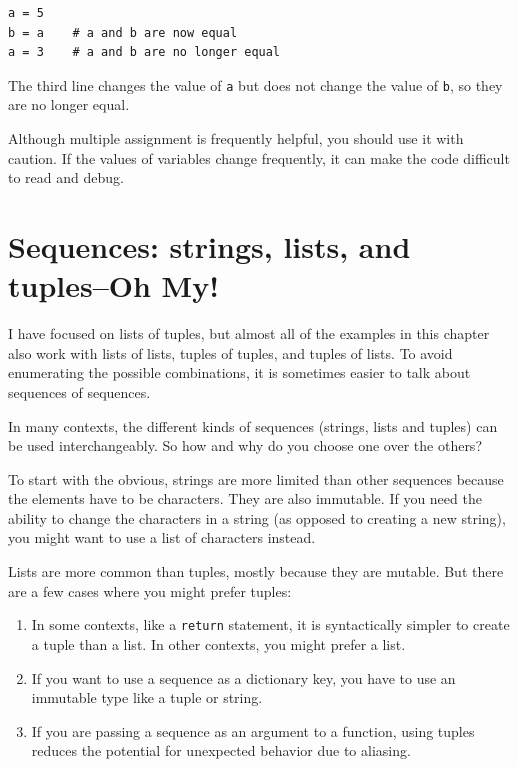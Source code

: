 \documentclass[10pt]{book}
\begin{document}
\beforeverb
\begin{verbatim}
a = 5
b = a    # a and b are now equal
a = 3    # a and b are no longer equal
\end{verbatim}
\afterverb
%
The third line changes the value of {\tt a} but does not change the
value of {\tt b}, so they are no longer equal. 

Although multiple assignment is frequently helpful, you should use it
with caution.  If the values of variables change frequently, it can
make the code difficult to read and debug.

\section{Sequences: strings, lists, and tuples--Oh My!}

I have focused on lists of tuples, but almost all of the examples in
this chapter also work with lists of lists, tuples of tuples, and
tuples of lists.  To avoid enumerating the possible combinations, it
is sometimes easier to talk about sequences of sequences.

In many contexts, the different kinds of sequences (strings, lists and
tuples) can be used interchangeably.  So how and why do you choose one
over the others?


To start with the obvious, strings are more limited than other
sequences because the elements have to be characters.  They are
also immutable.  If you need the ability to change the characters
in a string (as opposed to creating a new string), you might
want to use a list of characters instead.

Lists are more common than tuples, mostly because they are mutable.
But there are a few cases where you might prefer tuples:

\begin{enumerate}

\item In some contexts, like a {\tt return} statement, it is
syntactically simpler to create a tuple than a list.  In other
contexts, you might prefer a list.

\item If you want to use a sequence as a dictionary key, you
have to use an immutable type like a tuple or string.

\item If you are passing a sequence as an argument to a function,
using tuples reduces the potential for unexpected behavior
due to aliasing.

\end{enumerate}
\end{document}
